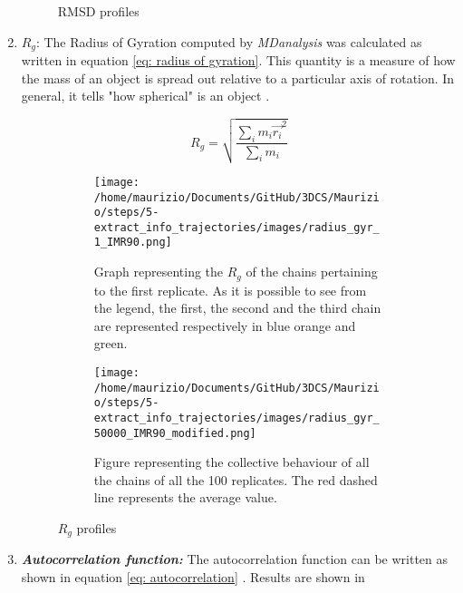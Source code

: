 \begin{enumerate}
\begin{figure}
        \caption{RMSD profiles}
        \label{fig:RMSD figures}
    \end{figure}


    \item \textbf{$R_g$}: The Radius of Gyration computed by \textit{MDanalysis} was calculated as written in equation \ref{eq: radius of gyration}. This quantity is a measure of how the mass of an object is spread out relative to a particular axis of rotation. In general, it tells "how spherical" is an object
    \cite{gowersMDAnalysisPythonPackage2016,tuckermanStatisticalMechanicsTheory2015}
    .
    

    \begin{equation} \label{eq: radius of gyration}
        R_g = \sqrt{\frac{\sum_i{m_i \vec{r_i}^2}}{\sum_i{m_i}}}    
    \end{equation}
    

    \begin{figure}
        \centering
        
        \begin{subfigure}{0.49\textwidth}
          \texttt{[image: /home/maurizio/Documents/GitHub/3DCS/Maurizio/steps/5-extract\_info\_trajectories/images/radius\_gyr\_1\_IMR90.png]}
          \caption{Graph representing the $R_g$ of the chains pertaining to the first replicate. As it is possible to see from the legend, the first, the second and the third chain are represented respectively in blue orange and green.}
          \label{fig:RG first replicate}
        \end{subfigure}
        \hfill
        \begin{subfigure}{0.49\textwidth}
          \texttt{[image: /home/maurizio/Documents/GitHub/3DCS/Maurizio/steps/5-extract\_info\_trajectories/images/radius\_gyr\_50000\_IMR90\_modified.png]}
          \caption{Figure representing the collective behaviour of all the chains of all the 100 replicates. The red dashed line represents the average value.}
          \label{fig:RG collective replicates}
        \end{subfigure}
      
        \caption{$R_g$ profiles}
        \label{fig:RG figures}
    \end{figure}


    \item \textit{\textbf{Autocorrelation function:}} The autocorrelation function can be written as shown in equation \ref{eq: autocorrelation}
    \cite{sumaElectricFieldDrivenTrappingPolyelectrolytes2018}
    . Results are shown in %
    

\end{enumerate}
